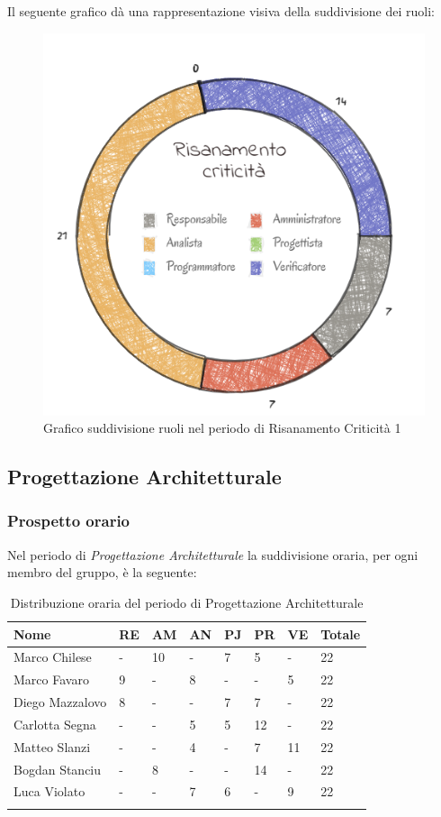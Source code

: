 Il seguente grafico dà una rappresentazione visiva della suddivisione dei ruoli:
\begin{figure}[H]
	\centering
  		\includegraphics[width=0.8\linewidth]{./images/torta_rc1.png}
  		\caption{Grafico suddivisione ruoli nel periodo di Risanamento Criticità 1}
  		\label{fig:grafico suddivione ruoli periodo di rc1}
\end{figure}


\subsection{Progettazione Architetturale}
\subsubsection{Prospetto orario}

Nel periodo di \textit{Progettazione Architetturale} la suddivisione oraria, per ogni membro del gruppo, è la seguente:


\begin{longtable}{|C{.30\textwidth}|C{.06\textwidth}|C{.06\textwidth}|C{.06\textwidth} | C{.06\textwidth}| C{.06\textwidth} | C{.06\textwidth} | C{.10\textwidth} |}
\hline
\textbf{Nome} & \textbf{RE} & \textbf{AM} & \textbf{AN} & \textbf{PJ} & \textbf{PR} & \textbf{VE} & \textbf{Totale}\\
\hline 
Marco Chilese & - & 10 & - & 7 & 5 & - & 22 \\
\hline
Marco Favaro & 9 & - & 8 & - & - & 5 & 22 \\
\hline
Diego Mazzalovo & 8 & - & - & 7 & 7 & - & 22 \\ 
\hline
Carlotta Segna & - & - & 5 & 5 & 12 & - & 22 \\
\hline
Matteo Slanzi & - & - & 4 & - & 7 & 11 & 22 \\
\hline
Bogdan Stanciu & - & 8 & - & - & 14 & - & 22 \\
\hline
Luca Violato & - & - & 7 & 6 & - & 9 & 22 \\
\hline 

\caption{Distribuzione oraria del periodo di Progettazione Architetturale}
\label{Distribuzione oraria del periodo di pa}
\end{longtable}

